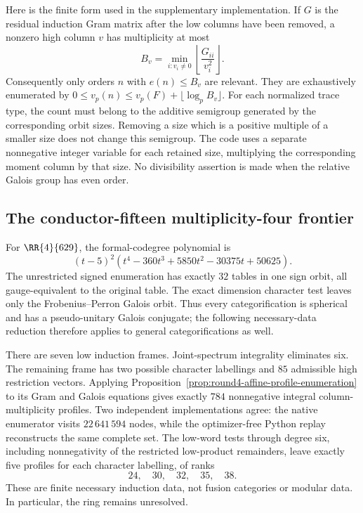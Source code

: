 Here is the finite form used in the supplementary implementation.  If $G$
is the residual induction Gram matrix after the low columns have been
removed, a nonzero high column $v$ has multiplicity at most
\[
 B_v=\min_{i:v_i\ne0}\left\lfloor\frac{G_{ii}}{v_i^2}\right\rfloor.
\]
Consequently only orders $n$ with $e(n)\le B_v$ are relevant.  They are
exhaustively enumerated by
$0\le v_p(n)\le v_p(F)+\lfloor\log_p B_v\rfloor$.
For each normalized trace type, the count must belong to the additive
semigroup generated by the corresponding orbit sizes.  Removing a size
which is a positive multiple of a smaller size does not change this
semigroup.  The code uses a separate nonnegative integer variable for each
retained size, multiplying the corresponding moment column by that size.
No divisibility assertion is made when the relative Galois group has even
order.

\subsection{The conductor-fifteen multiplicity-four frontier}
For $\RR{4}{629}$, the formal-codegree polynomial is
\[
 (t-5)^2(t^4-360t^3+5850t^2-30375t+50625).
\]
The unrestricted signed enumeration has exactly $32$ tables in one sign
orbit, all gauge-equivalent to the original table.  The exact dimension
character test leaves only the Frobenius--Perron Galois orbit.  Thus every
categorification is spherical and has a pseudo-unitary Galois conjugate;
the following necessary-data reduction therefore applies to general
categorifications as well.

There are seven low induction frames.  Joint-spectrum integrality eliminates
six.  The remaining frame has two possible character labellings and $85$
admissible high restriction vectors.  Applying
Proposition~\ref{prop:round4-affine-profile-enumeration} to its Gram and
Galois equations gives exactly $784$ nonnegative integral column-multiplicity
profiles.  Two independent implementations agree: the native enumerator
visits $22\,641\,594$ nodes, while the optimizer-free Python replay
reconstructs the same complete set.  The low-word tests through degree six,
including nonnegativity of the restricted low-product remainders, leave
exactly five profiles for each character labelling, of ranks
\[
 24,\quad 30,\quad 32,\quad 35,\quad 38.
\]
These are finite necessary induction data, not fusion categories or modular
data.  In particular, the ring remains unresolved.

